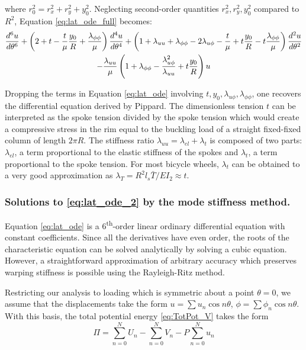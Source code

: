 \documentclass[\rootdir/thesis.tex]{subfiles}
\begin{document}
where $r_0^2=r_x^2+r_y^2+y_0^2$. Neglecting second-order quantities $r_x^2,r_y^2,y_0^2$ compared to $R^2$, Equation \eqref{eq:lat_ode_full} becomes:
\begin{multline}
\label{eq:lat_ode}
  \frac{d^6u}{d\theta^6}
  +\left(2+t-\frac{t}{\mu}\frac{y_0}{R}
         +\frac{\lambda_{\phi\phi}}{\mu}\right) \frac{d^4u}{d\theta^4}
  +\left(1+\lambda_{uu}+\lambda_{\phi\phi}-2\lambda_{u\phi}
         -\frac{t}{\mu}+t\frac{y_0}{R}
         -t\frac{\lambda_{\phi\phi}}{\mu}\right)\frac{d^2u}{d\theta^2}\\
  -\frac{\lambda_{uu}}{\mu}\left(1+\lambda_{\phi\phi}
                                 -\frac{\lambda_{u\phi}^2}{\lambda_{uu}}
                                 +t\frac{y_0}{R}\right)u
\end{multline}

Dropping the terms in Equation \eqref{eq:lat_ode} involving $t, y_0, \lambda_{u\phi}, \lambda_{\phi\phi}$, one recovers the differential equation derived by Pippard\cite{Pippard}. The dimensionless tension $t$ can be interpreted as the spoke tension divided by the spoke tension which would create a compressive stress in the rim equal to the buckling load of a straight fixed-fixed column of length $2\pi R$. The stiffness ratio $\lambda_{uu}=\lambda_{el}+\lambda_t$ is composed of two parts: $\lambda_{el}$, a term proportional to the elastic stiffness of the spokes and $\lambda_t$, a term proportional to the spoke tension. For most bicycle wheels, $\lambda_t$ can be obtained to a very good approximation as $\lambda_T = R^2l_s\bar{T}/EI_2 \approx t$.

\subsubsection{Solutions to \eqref{eq:lat_ode_2} by the mode stiffness method.}

Equation \eqref{eq:lat_ode} is a 6\textsuperscript{th}-order linear ordinary differential equation with constant coefficients. Since all the derivatives have even order, the roots of the characteristic equation can be solved analytically by solving a cubic equation. However, a straightforward approximation of arbitrary accuracy which preserves warping stiffness is possible using the Rayleigh-Ritz method.

Restricting our analysis to loading which is symmetric about a point $\theta=0$, we assume that the displacements take the form $u=\sum u_n \cos{n\theta}$, $\phi=\sum \phi_n \cos{n\theta}$. With this basis, the total potential energy \eqref{eq:TotPot_V} takes the form
\begin{equation}
\label{eq:TotPot_RR}
\Pi = \sum_{n=0}^{N} U_n - \sum_{n=0}^{N} V_n - P\sum_{n=0}^{N} u_n
\end{equation}
\end{document}
